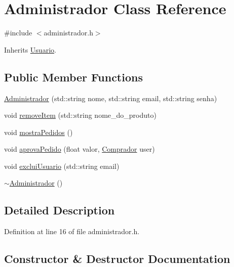 \hypertarget{class_administrador}{}\section{Administrador Class Reference}
\label{class_administrador}


{\ttfamily \#include $<$administrador.\+h$>$}



Inherits \hyperlink{class_usuario}{Usuario}.

\subsection*{Public Member Functions}
\begin{DoxyCompactItemize}
\item 
\hyperlink{class_administrador_a493c6aa5f70e459339fd7f05c12237b0}{Administrador} (std\+::string nome, std\+::string email, std\+::string senha)
\item 
void \hyperlink{class_administrador_ac3032625947549cda5dd58fa7a8a1544}{remove\+Item} (std\+::string nome\+\_\+do\+\_\+produto)
\item 
void \hyperlink{class_administrador_ac3d67279a170b9d7a56c1a8e8d6d8220}{mostra\+Pedidos} ()
\item 
void \hyperlink{class_administrador_a05604fe263be531162e5e98f57d5d5c2}{aprova\+Pedido} (float valor, \hyperlink{class_comprador}{Comprador} user)
\item 
void \hyperlink{class_administrador_a066e1af058776437c43a98dabb44f02b}{exclui\+Usuario} (std\+::string email)
\item 
\hyperlink{class_administrador_a0e044ad3a41da3a0ff2c1ec7ef8fa800}{$\sim$\+Administrador} ()
\end{DoxyCompactItemize}


\subsection{Detailed Description}


Definition at line 16 of file administrador.\+h.



\subsection{Constructor \& Destructor Documentation}
\mbox{\label{class_administrador_a493c6aa5f70e459339fd7f05c12237b0}} 
